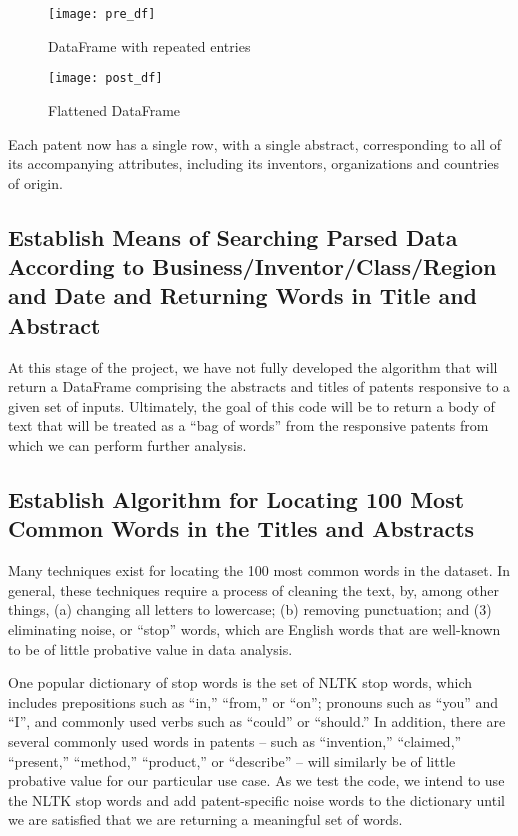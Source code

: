 \documentclass{article}
\begin{document}
\begin{figure}[H]
\texttt{[image: pre\_df]}
\centering
\caption{DataFrame with repeated entries}
\label{fig:pre_df}
\end{figure}

\begin{figure}[H]
\texttt{[image: post\_df]}
\centering
\caption{Flattened DataFrame}
\label{fig:post_df}
\end{figure}

Each patent now has a single row, with a single abstract, corresponding to all of its accompanying attributes, including its inventors, organizations and countries of origin.

\subsection{Establish Means of Searching Parsed Data According to Business/Inventor/Class/Region and Date and Returning Words in Title and Abstract}

At this stage of the project, we have not fully developed the algorithm that will return a DataFrame comprising the abstracts and titles of patents responsive to a given set of inputs.  Ultimately, the goal of this code will be to return a body of text that will be treated as a “bag of words” from the responsive patents from which we can perform further analysis.  

\subsection{Establish Algorithm for Locating 100 Most Common Words in the Titles and Abstracts}

Many techniques exist for locating the 100 most common words in the dataset\cite{website:Mast}. In general, these techniques require a process of cleaning the text, by, among other things,  (a) changing all letters to lowercase; (b) removing punctuation; and (3) eliminating noise, or “stop” words, which are English words that are well-known to be of little probative value in data analysis.

One popular dictionary of stop words is the set of NLTK stop words, which includes prepositions such as “in,” “from,” or “on”; pronouns such as “you” and “I”, and commonly used verbs such as “could” or “should.”  In addition, there are several commonly used words in patents – such as “invention,” “claimed,” “present,” “method,” “product,” or “describe” – will similarly be of little probative value for our particular use case.  As we test the code, we intend to use the NLTK stop words and add patent-specific noise words to the dictionary until we are satisfied that we are returning a meaningful set of words.  
\end{document}
